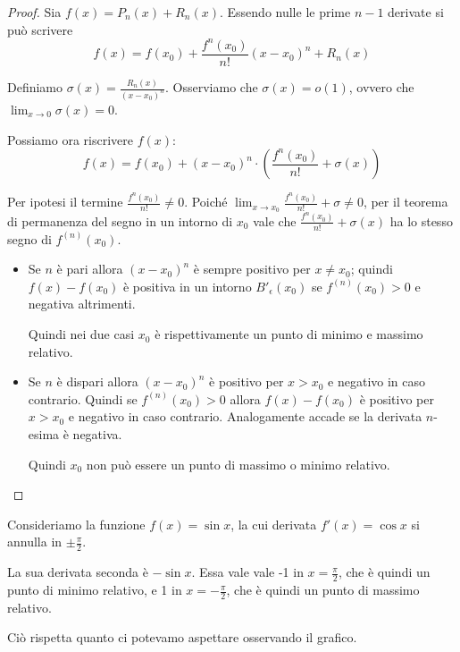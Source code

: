 \begin{proof}
Sia $f(x) = P_n(x) + R_n(x)$. Essendo nulle le prime $n-1$ derivate si può scrivere
\begin{equation*}
f(x) = f(x_0) + \frac{f^n(x_0)}{n!} (x-x_0)^n + R_n(x)
\end{equation*}

Definiamo $\sigma(x) = \frac{R_n(x)}{(x-x_0)^n}$. Osserviamo che $\sigma(x) = o(1)$, ovvero che $\lim_{x \to 0} \sigma (x) = 0$.

Possiamo ora riscrivere $f(x)$:
\begin{equation*}
f(x) = f(x_0) + (x-x_0)^n \cdot \left(\frac{f^n(x_0)}{n!} +\sigma(x) \right)
\end{equation*}

Per ipotesi il termine $\frac{f^n(x_0)}{n!} \neq 0$. Poiché $\lim_{x \to x_0} \frac{f^n(x_0)}{n!} + \sigma \neq 0$, per il teorema di permanenza del segno in un intorno di $x_0$ vale che $\frac{f^n(x_0)}{n!} + \sigma(x)$ ha lo stesso segno di $f^{(n)} (x_0)$.

\begin{itemize}
\item Se $n$ è pari allora $(x-x_0)^n$ è sempre positivo per $x \neq x_0$; quindi $f(x)-f(x_0)$ è positiva in un intorno $B'_\epsilon(x_0)$ se $f^{(n)} (x_0) > 0$ e negativa altrimenti.

Quindi nei due casi $x_0$ è rispettivamente un punto di minimo e massimo relativo.

\item Se $n$ è dispari allora $(x-x_0)^n$ è positivo per $x>x_0$ e negativo in caso contrario. Quindi se $f^{(n)} (x_0) > 0$ allora $f(x)-f(x_0)$ è positivo per $x > x_0$ e negativo in caso contrario. Analogamente accade se la derivata $n$-esima è negativa.

Quindi $x_0$ non può essere un punto di massimo o minimo relativo.
\end{itemize}
\end{proof}

\begin{example}
Consideriamo la funzione $f(x) = \sin x$, la cui derivata $f'(x) = \cos x$ si annulla in $\pm \frac{\pi}{2}$.

La sua derivata seconda è $-\sin x$. Essa vale vale -1 in $x = \frac{\pi}{2}$, che è quindi un punto di minimo relativo, e 1 in $x = -\frac{\pi}{2}$, che è quindi un punto di massimo relativo. 

Ciò rispetta quanto ci potevamo aspettare osservando il grafico.
\end{example}